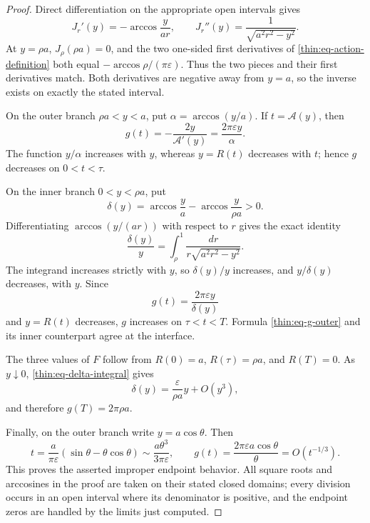 \documentclass[11pt]{article}
\numberwithin{equation}{section}
\theoremstyle{definition}
\theoremstyle{remark}
\begin{document}
\begin{proof}
Direct differentiation on the appropriate open intervals gives
\begin{equation}
  J_r'(y)=-\arccos\frac{y}{ar},
  \qquad
  J_r''(y)=\frac1{\sqrt{a^2r^2-y^2}}.
  \label{thin:eq-J-derivatives}
\end{equation}
At \(y=\rho a\), \(J_\rho(\rho a)=0\), and the two one-sided first
derivatives of \eqref{thin:eq-action-definition} both equal
\(-\arccos\rho/(\pi\varepsilon)\).  Thus the two pieces and their first
derivatives match.  Both derivatives are negative away from \(y=a\), so the
inverse exists on exactly the stated interval.

On the outer branch \(\rho a<y<a\), put
\(\alpha=\arccos(y/a)\).  If \(t=\mathcal A(y)\), then
\begin{equation}
  g(t)=-\frac{2y}{\mathcal A'(y)}
      =\frac{2\pi\varepsilon y}{\alpha}.
  \label{thin:eq-g-outer}
\end{equation}
The function \(y/\alpha\) increases with \(y\), whereas \(y=R(t)\)
decreases with \(t\); hence \(g\) decreases on \(0<t<\tau\).

On the inner branch \(0<y<\rho a\), put
\[
  \delta(y)=\arccos\frac ya-\arccos\frac{y}{\rho a}>0.
\]
Differentiating \(\arccos(y/(ar))\) with respect to \(r\) gives the exact
identity
\begin{equation}
  \frac{\delta(y)}{y}
  =\int_\rho^1\frac{dr}{r\sqrt{a^2r^2-y^2}}.
  \label{thin:eq-delta-integral}
\end{equation}
The integrand increases strictly with \(y\), so \(\delta(y)/y\) increases,
and \(y/\delta(y)\) decreases, with \(y\).  Since
\[
  g(t)=\frac{2\pi\varepsilon y}{\delta(y)}
\]
and \(y=R(t)\) decreases, \(g\) increases on \(\tau<t<T\).  Formula
\eqref{thin:eq-g-outer} and its inner counterpart agree at the interface.

The three values of \(F\) follow from
\(R(0)=a\), \(R(\tau)=\rho a\), and \(R(T)=0\).  As \(y\downarrow0\),
\eqref{thin:eq-delta-integral} gives
\[
  \delta(y)=\frac{\varepsilon}{\rho a}y+O(y^3),
\]
and therefore \(g(T)=2\pi\rho a\).

Finally, on the outer branch write \(y=a\cos\theta\).  Then
\begin{equation}
  t=\frac{a}{\pi\varepsilon}
       (\sin\theta-\theta\cos\theta)
    \sim\frac{a\theta^3}{3\pi\varepsilon},
  \qquad
  g(t)=\frac{2\pi\varepsilon a\cos\theta}{\theta}
       =O(t^{-1/3}).
  \label{thin:eq-improper-asymptotic}
\end{equation}
This proves the asserted improper endpoint behavior.  All square roots and
arccosines in the proof are taken on their stated closed domains; every
division occurs in an open interval where its denominator is positive, and
the endpoint zeros are handled by the limits just computed.
\end{proof}
\end{document}
